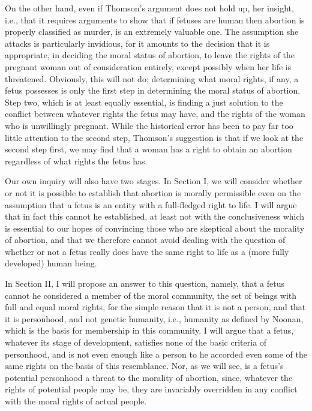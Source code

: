On the other hand, even if Thomson’s argument does not
hold up, her insight, i.e., that it requires arguments to show that if fetuses are human then abortion is properly
classified as murder, is an extremely valuable one. The
assumption she attacks is particularly invidious, for it
amounts to the decision that it is appropriate, in deciding
the moral status of abortion, to leave the rights of the
pregnant woman out of consideration entirely, except
possibly when her life is threatened. Obviously, this will
not do; determining what moral rights, if any, a fetus
possesses is only the first step in determining the moral
status of abortion. Step two, which is at least equally
essential, is finding a just solution to the conflict between
whatever rights the fetus may have, and the rights of the
woman who is unwillingly pregnant. While the historical
error has been to pay far too little attention to the second
step, Thomson’s suggestion is that if we look at the
second step first, we may find that a woman has a right to
obtain an abortion regardless of what rights the fetus has.

Our own inquiry will also have two stages. In Section I,
we will consider whether or not it is possible to establish
that abortion is morally permissible even on the
assumption that a fetus is an entity with a full-fledged
right to life. I will argue that in fact this cannot he
established, at least not with the conclusiveness which is
essential to our hopes of convincing those who are
skeptical about the morality of abortion, and that we
therefore cannot avoid dealing with the question of
whether or not a fetus really does have the same right to
life as a (more fully developed) human being.

In Section II, I will propose an answer to this question,
namely, that a fetus cannot he considered a member of the
moral community, the set of beings with full and equal
moral rights, for the simple reason that it is not a person,
and that it is personhood, and not genetic humanity, i.e.,
humanity as defined by Noonan, which is the basis for
membership in this community. I will argue that a fetus,
whatever its stage of development, satisfies none of the
basic criteria of personhood, and is not even enough like a
person to he accorded even some of the same rights on the
basis of this resemblance. Nor, as we will see, is a fetus’s
potential personhood a threat to the morality of abortion,
since, whatever the rights of potential people may be, they
are invariably overridden in any conflict with the moral
rights of actual people.

